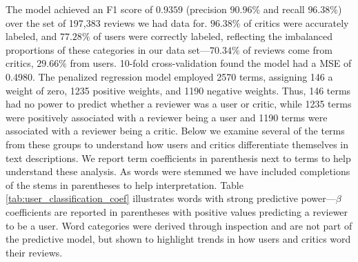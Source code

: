 \documentclass[letterpaper]{article}
\begin{document}
The model achieved an F1 score of $0.9359$ (precision $90.96\%$ and recall $96.38\%$) over the set of 197,383 reviews we had data for. $96.38\%$ of critics were accurately labeled, and $77.28\%$ of users were correctly labeled, reflecting the imbalanced proportions of these categories in our data set---$70.34\%$ of reviews come from critics, $29.66\%$ from users. 10-fold cross-validation found the model had a MSE of 0.4980. The penalized regression model employed 2570 terms, assigning 146 a weight of zero, 1235 positive weights, and 1190 negative weights. Thus, 146 terms had no power to predict whether a reviewer was a user or critic, while 1235 terms were positively associated with a reviewer being a user and 1190 terms were associated with a reviewer being a critic. Below we examine several of the terms from these groups to understand how users and critics differentiate themselves in text descriptions. We report term coefficients in parenthesis next to terms to help understand these analysis. As words were stemmed we have included completions of the stems in parentheses to help interpretation. Table \ref{tab:user_classification_coef} illustrates words with strong predictive power---$\beta$ coefficients are reported in parentheses with positive values predicting a reviewer to be a user. Word categories were derived through inspection and are not part of the predictive model, but shown to highlight trends in how users and critics word their reviews. 
\end{document}
